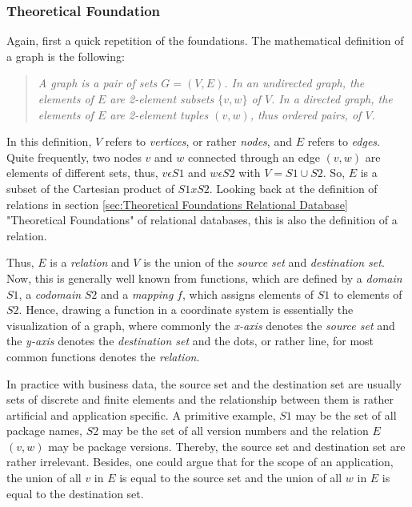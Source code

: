 \subsubsection{Theoretical Foundation} \label{sec:GraphDB Theoretical Foundation}
Again, first a quick repetition of the foundations. The mathematical definition of a graph is the following: 
\begin{quote}
	\textit{A graph is a pair of sets $G = (V,E)$. In an undirected graph, the elements of $E$ are 2-element subsets $\{v,w\}$ of $V$. In a directed graph, the elements of $E$ are 2-element tuples $(v,w)$, thus ordered pairs, of $V$.}
	\cite{IntroductionToAlgorithms}
\end{quote}
In this definition, $V$ refers to \emph{vertices}, or rather \emph{nodes}, and $E$ refers to \emph{edges}. Quite frequently, two nodes $v$ and $w$ connected through an edge $(v,w)$ are elements of different sets, thus, $v \epsilon S1$ and $w \epsilon S2$ with $V = S1 \cup S2$. So, $E$ is a subset of the Cartesian product of $S1 x S2$. Looking back at the definition of relations in section \ref{sec:Theoretical Foundations Relational Database} "Theoretical Foundations" of relational databases, this is also the definition of a relation.\par
Thus, $E$ is a \emph{relation} and $V$ is the union of the \emph{source set} and \emph{destination set}. Now, this is generally well known from functions, which are defined by a \emph{domain} $S1$, a \emph{codomain} $S2$ and a \emph{mapping} $f$, which assigns elements of $S1$ to elements of $S2$. Hence, drawing a function in a coordinate system is essentially the visualization of a graph, where commonly the \emph{x-axis} denotes the \emph{source set} and the \emph{y-axis} denotes the \emph{destination set} and the dots, or rather line, for most common functions denotes the \emph{relation}.\par
In practice with business data, the source set and the destination set are usually sets of discrete and finite elements and the relationship between them is rather artificial and application specific. A primitive example, $S1$ may be the set of all package names, $S2$ may be the set of all version numbers and the relation $E$ $(v, w)$ may be package versions. Thereby, the source set and destination set are rather irrelevant. Besides, one could argue that for the scope of an application, the union of all $v$ in $E$ is equal to the source set and the union of all $w$ in $E$ is equal to the destination set.

